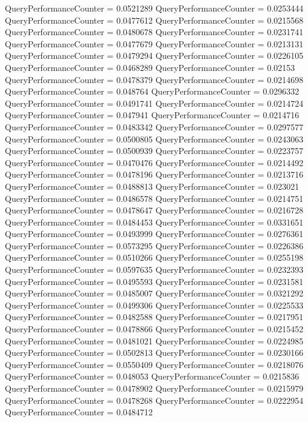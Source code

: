\documentclass[9pt]{article}
\theoremstyle{plain}
\theoremstyle{definition}
\theoremstyle{remark}
\numberwithin{equation}{section}
\begin{document}
QueryPerformanceCounter  =  0.0521289
QueryPerformanceCounter  =  0.0253444
QueryPerformanceCounter  =  0.0477612
QueryPerformanceCounter  =  0.0215568
QueryPerformanceCounter  =  0.0480678
QueryPerformanceCounter  =  0.0231741
QueryPerformanceCounter  =  0.0477679
QueryPerformanceCounter  =  0.0213131
QueryPerformanceCounter  =  0.0479294
QueryPerformanceCounter  =  0.0226105
QueryPerformanceCounter  =  0.0468289
QueryPerformanceCounter  =  0.02153
QueryPerformanceCounter  =  0.0478379
QueryPerformanceCounter  =  0.0214698
QueryPerformanceCounter  =  0.048764
QueryPerformanceCounter  =  0.0296332
QueryPerformanceCounter  =  0.0491741
QueryPerformanceCounter  =  0.0214724
QueryPerformanceCounter  =  0.047941
QueryPerformanceCounter  =  0.0214716
QueryPerformanceCounter  =  0.0483342
QueryPerformanceCounter  =  0.0297577
QueryPerformanceCounter  =  0.0500805
QueryPerformanceCounter  =  0.0243063
QueryPerformanceCounter  =  0.0500939
QueryPerformanceCounter  =  0.0223757
QueryPerformanceCounter  =  0.0470476
QueryPerformanceCounter  =  0.0214492
QueryPerformanceCounter  =  0.0478196
QueryPerformanceCounter  =  0.0213716
QueryPerformanceCounter  =  0.0488813
QueryPerformanceCounter  =  0.023021
QueryPerformanceCounter  =  0.0486578
QueryPerformanceCounter  =  0.0214751
QueryPerformanceCounter  =  0.0478647
QueryPerformanceCounter  =  0.0216728
QueryPerformanceCounter  =  0.0484453
QueryPerformanceCounter  =  0.0331651
QueryPerformanceCounter  =  0.0493999
QueryPerformanceCounter  =  0.0276361
QueryPerformanceCounter  =  0.0573295
QueryPerformanceCounter  =  0.0226386
QueryPerformanceCounter  =  0.0510266
QueryPerformanceCounter  =  0.0255198
QueryPerformanceCounter  =  0.0597635
QueryPerformanceCounter  =  0.0232393
QueryPerformanceCounter  =  0.0495593
QueryPerformanceCounter  =  0.0231581
QueryPerformanceCounter  =  0.0485007
QueryPerformanceCounter  =  0.0321292
QueryPerformanceCounter  =  0.0499306
QueryPerformanceCounter  =  0.0225533
QueryPerformanceCounter  =  0.0482588
QueryPerformanceCounter  =  0.0217951
QueryPerformanceCounter  =  0.0478866
QueryPerformanceCounter  =  0.0215452
QueryPerformanceCounter  =  0.0481021
QueryPerformanceCounter  =  0.0224985
QueryPerformanceCounter  =  0.0502813
QueryPerformanceCounter  =  0.0230166
QueryPerformanceCounter  =  0.0550409
QueryPerformanceCounter  =  0.0218076
QueryPerformanceCounter  =  0.048053
QueryPerformanceCounter  =  0.0215836
QueryPerformanceCounter  =  0.0478902
QueryPerformanceCounter  =  0.0215979
QueryPerformanceCounter  =  0.0478268
QueryPerformanceCounter  =  0.0222954
QueryPerformanceCounter  =  0.0484712
\end{document}
